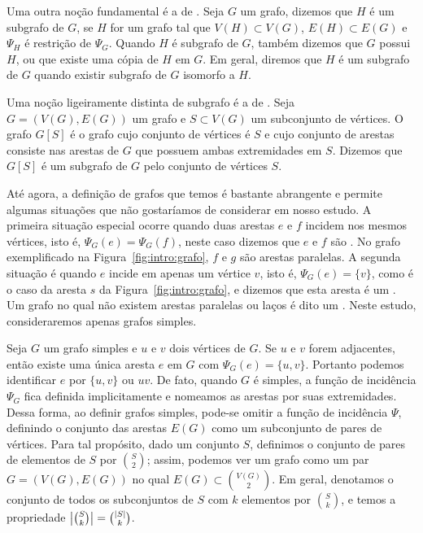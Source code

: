 Uma outra noção fundamental é a de . Seja $G$ um grafo, dizemos que $H$ é um subgrafo de $G$, se $H$ for um grafo tal que $V(H) \subset V(G)$, $E(H) \subset E(G)$ e $\Psi_H$ é restrição de $\Psi_G$. Quando $H$ é subgrafo de $G$, também dizemos que $G$ possui $H$, ou que existe uma cópia de $H$ em $G$. Em geral, diremos que $H$ é um subgrafo de $G$ quando existir subgrafo de $G$ isomorfo a $H$.

Uma noção ligeiramente distinta de subgrafo é a de . Seja $G = (V(G), E(G))$ um grafo e $S \subset V(G)$ um subconjunto de vértices. O grafo $G[S]$ é o grafo cujo conjunto de vértices é $S$ e cujo conjunto de arestas consiste nas arestas de $G$ que possuem ambas extremidades em $S$. Dizemos que $G[S]$ é um subgrafo de $G$  pelo conjunto de vértices $S$.

Até agora, a definição de grafos que temos é bastante abrangente e permite algumas situações que não gostaríamos de considerar em nosso estudo. A primeira situação especial ocorre quando duas arestas $e$ e $f$ incidem nos mesmos vértices, isto é, $\Psi_G(e) = \Psi_G(f)$, neste caso dizemos que $e$ e $f$ são . No grafo exemplificado na Figura~\ref{fig:intro:grafo}, $f$ e $g$ são arestas paralelas.
A segunda situação é quando $e$ incide em apenas um vértice $v$, isto é, $\Psi_G(e) = \{v\}$, como é o caso da aresta $s$ da Figura~\ref{fig:intro:grafo}, e dizemos que esta aresta é um . Um grafo no qual não existem arestas paralelas ou laços é dito um . Neste estudo, consideraremos apenas grafos simples.

Seja $G$ um grafo simples e $u$ e $v$ dois vértices de $G$. Se $u$ e $v$ forem adjacentes, então existe uma única aresta $e$ em $G$ com $\Psi_G(e) = \{u,v\}$. Portanto podemos identificar $e$ por $\{u,v\}$ ou $uv$. De fato, quando $G$ é simples, a função de incidência $\Psi_G$ fica definida implicitamente e nomeamos as arestas por suas extremidades. Dessa forma, ao definir grafos simples, pode-se omitir a função de incidência $\Psi$, definindo o conjunto das arestas $E(G)$ como um subconjunto de pares de vértices.
Para tal propósito, dado um conjunto $S$, definimos o conjunto de pares de elementos de $S$ por $\binom{S}{2}$; assim, podemos ver um grafo como um par $G = (V(G),E(G))$ no qual $E(G) \subset \binom{V(G)}{2}$. Em geral, denotamos o conjunto de todos os subconjuntos de $S$ com $k$ elementos por $\binom{S}{k}$, e temos a propriedade $\big| \binom{S}{k} \big| = \binom{\left | S \right |}{k}$.

